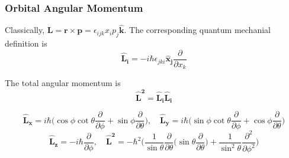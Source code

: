 \documentclass[a4paper]{article}
\begin{document}
\subsubsection*{Orbital Angular Momentum}
\begin{defi}
Classically,  $\mathbf{L}=\mathbf{r}\times\mathbf{p}=\epsilon_{ijk}x_ip_j\mathbf{\hat{k}}$. The corresponding quantum mechanial definition is
$$\mathbf{\hat{L}_i}=-i\hbar\epsilon_{jki}\mathbf{\hat{x}_j}\frac{\partial}{\partial x_k}$$
\end{defi}
\begin{defi}
The total angular momentum is
$$\mathbf{\hat{L}^2}=\mathbf{\hat{L}_i}\mathbf{\hat{L}_i}$$
\end{defi}
\begin{thm}
$$\mathbf{\hat{L}_x}=i\hbar\bigg(\cos\phi\cot\theta\frac{\partial}{\partial\phi}+\sin\phi\frac{\partial}{\partial\theta}\bigg),\quad\mathbf{\hat{L}_y}=i\hbar\bigg(\sin\phi\cot\theta\frac{\partial}{\partial\phi}+\cos\phi\frac{\partial}{\partial\theta}\bigg)$$
$$\mathbf{\hat{L}_z}=-i\hbar\frac{\partial}{\partial\phi},\quad\mathbf{\hat{L}^2}=-\hbar^2\bigg(\frac{1}{\sin\theta}\frac{\partial}{\partial\theta}\bigg(\sin\theta\frac{\partial}{\partial\theta}\bigg)+\frac{1}{\sin^2\theta}\frac{\partial^2}{\partial\phi^2}\bigg)$$
\end{thm}
\end{document}
